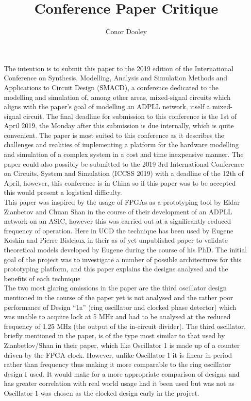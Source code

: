 \documentclass[a4paper,12pt]{article}
\title{Conference Paper Critique}
\author{Conor Dooley}
\begin{document}
\maketitle

The intention is to submit this paper to the 2019 edition of the International Conference on Synthesis, Modelling, Analysis and Simulation Methods and Applications to Circuit Design (SMACD), a conference dedicated to the modelling and simulation of, among other areas, mixed-signal circuits which aligns with the paper's goal of modelling an ADPLL network, itself a mixed-signal circuit. The final deadline for submission to this conference is the 1st of April 2019, the Monday after this submission is due internally, which is quite convenient. The paper is most suited to this conference as it describes the challenges and realities of implementing a platform for the hardware modelling and simulation of a complex system in a cost and time inexpensive manner. The paper could also possibly be submitted to the 2019 3rd International Conference on Circuits, System and Simulation (ICCSS 2019) with a deadline of the 12th of April, however, this conference is in China so if this paper was to be accepted this would present a logistical difficulty.\\

This paper was inspired by the usage of FPGAs as a prototyping tool by Eldar Zianbetov and Chuan Shan in the course of their development of an ADPLL network on an ASIC, however this was carried out at a significantly reduced frequency of operation. Here in UCD the technique has been used by Eugene Koskin and Pierre Bisleaux in their as of yet unpublished paper to validate theoretical models developed by Eugene during the course of his PhD. The initial goal of the project was to investigate a number of possible architectures for this prototyping platform, and this paper explains the designs analysed and the benefits of each technique \\

The two most glaring omissions in the paper are the third oscillator design mentioned in the course of the paper yet is not analysed and the rather poor performance of Design ``1a'' (ring oscillator and clocked phase detector) which was unable to acquire lock at 5 MHz and had to be analysed at the reduced frequency of 1.25 MHz (the output of the in-circuit divider). %
The third oscillator, briefly mentioned in the paper, is of the type most similar to that used by Zianbetlov/Shan in their paper, which like Oscillator 1 is made up of a counter driven by the FPGA clock. However, unlike Oscillator 1 it is linear in period rather than frequency thus making it more comparable to the ring oscillator design I used. It would make for a more appropriate comparison of designs and has greater correlation with real world usage had it been used but was not as Oscillator 1 was chosen as the clocked design early in the project.\\
\end{document}

